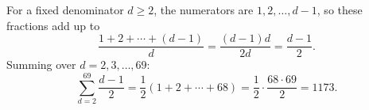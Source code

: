 For a fixed denominator $d\ge2$, the numerators are $1,2,\dots,d-1$, so these fractions add up to
\[\dfrac{1+2+\cdots+(d-1)}{d}=\dfrac{(d-1)d}{2d}=\dfrac{d-1}{2}.\]
Summing over $d=2,3,\dots,69$:
\[\sum_{d=2}^{69}\dfrac{d-1}{2}=\dfrac12(1+2+\cdots+68)=\dfrac12\cdot\dfrac{68\cdot69}{2}=\boxed{1173}.\]
